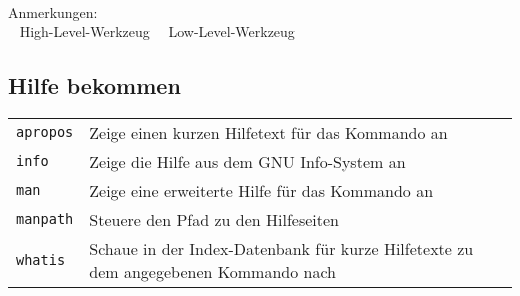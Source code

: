\documentclass[10pt,a4paper]{article}
\begin{document}
\begin{multicols}{2}
~ \\
\noindent Anmerkungen: \\ ~ High-Level-Werkzeug ~~Low-Level-Werkzeug

\end{multicols}

\newpage

\cheatsheet

\begin{multicols}{2}   

\section{Hilfe bekommen\phantom{g}}
\begin{tabular}{ p{2.5cm} p{8.5cm} }
  \hline
  \texttt{apropos} & Zeige einen kurzen Hilfetext für das Kommando an \\
  \rowcolor{Gray}
  \texttt{info} & Zeige die Hilfe aus dem GNU Info-System an\\
  \texttt{man} & Zeige eine erweiterte Hilfe für das Kommando an \\
  \rowcolor{Gray}
  \texttt{manpath} & Steuere den Pfad zu den Hilfeseiten \\
  \texttt{whatis} & Schaue in der Index-Datenbank für kurze Hilfetexte zu dem angegebenen Kommando nach \\
  \hline
\end{tabular}

~ \\
\vfill


\end{multicols}
\end{document}
